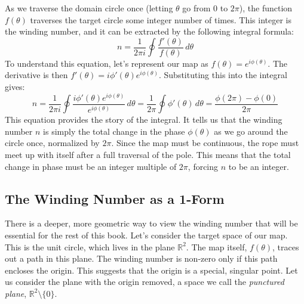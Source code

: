 As we traverse the domain circle once (letting $\theta$ go from $0$ to $2\pi$), the function $f(\theta)$ traverses the target circle some integer number of times.
This integer is the winding number, and it can be extracted by the following integral formula:
\begin{equation}
    n = \frac{1}{2\pi i} \oint \frac{f'(\theta)}{f(\theta)} \, d\theta
    \label{eq:winding_number_integral}
\end{equation}
To understand this equation, let's represent our map as $f(\theta) = e^{i\phi(\theta)}$.
The derivative is then $f'(\theta) = i \phi'(\theta) e^{i\phi(\theta)}$.
Substituting this into the integral gives:
\begin{equation}
    n = \frac{1}{2\pi i} \oint \frac{i \phi'(\theta) e^{i\phi(\theta)}}{e^{i\phi(\theta)}} \, d\theta = \frac{1}{2\pi} \oint \phi'(\theta) \, d\theta = \frac{\phi(2\pi) - \phi(0)}{2\pi}
\end{equation}
This equation provides the story of the integral.
It tells us that the winding number $n$ is simply the total change in the phase $\phi(\theta)$ as we go around the circle once, normalized by $2\pi$.
Since the map must be continuous, the rope must meet up with itself after a full traversal of the pole.
This means that the total change in phase must be an integer multiple of $2\pi$, forcing $n$ to be an integer.

\subsection{The Winding Number as a 1-Form}
\label{subsec:winding_1_form}

There is a deeper, more geometric way to view the winding number that will be essential for the rest of this book.
Let's consider the target space of our map.
This is the unit circle, which lives in the plane $\mathbb{R}^2$.
The map itself, $f(\theta)$, traces out a path in this plane.
The winding number is non-zero only if this path encloses the origin.
This suggests that the origin is a special, singular point.
Let us consider the plane with the origin removed, a space we call the \textit{punctured plane}, $\mathbb{R}^2 \setminus \{0\}$.

